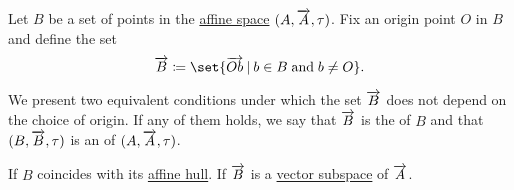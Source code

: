 \begin{definition}\label{def:affine_subspace}
  Let \( B \) be a set of points in the \hyperref[def:affine_space]{affine space} \( (A, \overrightarrow{A}, \tau) \). Fix an origin point \( O \) in \( B \) and define the set
  \begin{equation}\label{eq:def:affine_subspace/direction}
    \vect B \coloneqq \set{ \vect{Ob} \given b \in B \T{and} b \neq O }.
  \end{equation}

  We present two equivalent conditions under which the set \( \overrightarrow{B} \) does not depend on the choice of origin. If any of them holds, we say that \( \overrightarrow{B} \) is the  of \( B \) and that \( (B, \overrightarrow{B}, \tau) \) is an  of \( (A, \overrightarrow{A}, \tau) \).

  \begin{thmenum}
     If \( B \) coincides with its \hyperref[def:affine_hull]{affine hull}.
     If \( \overrightarrow{B} \) is a \hyperref[def:module/submodel]{vector subspace} of \( \overrightarrow{A} \).
  \end{thmenum}
\end{definition}
